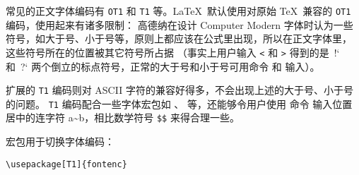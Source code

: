 常见的正文字体编码有 \texttt{OT1} 和 \texttt{T1} 等。\LaTeX\ 默认使用对原始 \TeX\ 兼容的 \texttt{OT1} 编码，使用起来有诸多限制：
高德纳在设计 Computer Modern 字体时认为一些符号，如大于号、小于号等，原则上都应该在公式里出现，所以在正文字体里，
这些符号所在的位置被其它符号所占据
（事实上用户输入 \texttt< 和 \texttt> 得到的是\ !` 和\ ?` 两个倒立的标点符号，正常的大于号和小于号可用命令  和  输入）。

扩展的 \texttt{T1} 编码则对 ASCII 字符的兼容好得多，不会出现上述的大于号、小于号的问题。
\texttt{T1} 编码配合一些字体宏包如 、 等，还能够令用户使用  命令
输入位置居中的连字符 a\textasciitilde b，相比数学符号 \texttt\$\texttt\$ 来得合理一些。

 宏包用于切换字体编码：
\begin{verbatim}
\usepackage[T1]{fontenc}
\end{verbatim}

